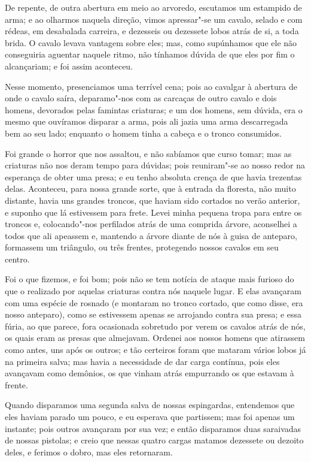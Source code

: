 De repente, de outra abertura em meio ao arvoredo, escutamos um
estampido de arma; e ao olharmos naquela direção, vimos apressar"-se um
cavalo, selado e com rédeas, em desabalada carreira, e dezesseis ou
dezessete lobos atrás de si, a toda brida. O cavalo levava vantagem
sobre eles; mas, como supúnhamos que ele não conseguiria aguentar
naquele ritmo, não tínhamos dúvida de que eles por fim o alcançariam; e
foi assim aconteceu.

Nesse momento, presenciamos uma terrível cena; pois ao cavalgar à
abertura de onde o cavalo saíra, deparamo"-nos com as carcaças de outro
cavalo e dois homens, devorados pelas famintas criaturas; e um dos
homens, sem dúvida, era o mesmo que ouvíramos disparar a arma, pois ali
jazia uma arma descarregada bem ao seu lado; enquanto o homem tinha a
cabeça e o tronco consumidos.

Foi grande o horror que nos assaltou, e não sabíamos que curso tomar;
mas as criaturas não nos deram tempo para dúvidas; pois reuniram"-se ao
nosso redor na esperança de obter uma presa; e eu tenho absoluta crença
de que havia trezentas delas. Aconteceu, para nossa grande sorte, que à
entrada da floresta, não muito distante, havia uns grandes troncos, que
haviam sido cortados no verão anterior, e suponho que lá estivessem para
frete. Levei minha pequena tropa para entre os troncos e, colocando"-nos
perfilados atrás de uma comprida árvore, aconselhei a todos que ali
apeassem e, mantendo a árvore diante de nós à guisa de anteparo,
formassem um triângulo, ou três frentes, protegendo nossos cavalos em
seu centro.

Foi o que fizemos, e foi bom; pois não se tem notícia de ataque mais
furioso do que o realizado por aquelas criaturas contra nós naquele
lugar. E elas avançaram com uma espécie de rosnado (e montaram no tronco
cortado, que como disse, era nosso anteparo), como se estivessem apenas
se arrojando contra sua presa; e essa fúria, ao que parece, fora
ocasionada sobretudo por verem os cavalos atrás de nós, os quais eram as
presas que almejavam. Ordenei aos nossos homens que atirassem como
antes, uns após os outros; e tão certeiros foram que mataram vários
lobos já na primeira salva; mas havia a necessidade de dar carga
contínua, pois eles avançavam como demônios, os que vinham atrás
empurrando os que estavam à frente.

Quando disparamos uma segunda salva de nossas espingardas, entendemos
que eles haviam parado um pouco, e eu esperava que partissem; mas foi
apenas um instante; pois outros avançaram por sua vez; e então
disparamos duas saraivadas de nossas pistolas; e creio que nessas quatro
cargas matamos dezessete ou dezoito deles, e ferimos o dobro, mas eles
retornaram.

